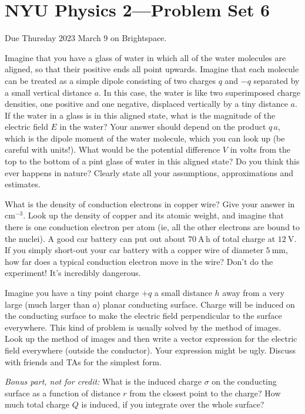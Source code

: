\documentclass[12pt]{article}
\begin{document}
\section*{NYU Physics 2---Problem Set 6}

Due Thursday 2023 March 9 on Brightspace.

\startproblem%
Imagine that you have a glass of water in which all of the water
molecules are aligned, so that their positive ends all point upwards.
Imagine that each molecule can be treated as a simple dipole
consisting of two charges $q$ and $-q$ separated by a small vertical
distance $a$.  In this case, the water is like two superimposed charge
densities, one positive and one negative, displaced vertically by a
tiny distance $a$.  If the water in a glass is in this aligned state,
what is the magnitude of the electric field $E$ in the water?  Your
answer should depend on the product $q\,a$, which is the dipole moment
of the water molecule, which you can look up (be careful with units!).  What would
be the potential difference $V$ in volts from the top to the bottom of
a pint glass of water in this aligned state? Do you think this ever
happens in nature? Clearly state all your assumptions, approximations
and estimates.

\startproblem%
What is the density of conduction electrons in copper wire?  Give your
answer in $\mathrm{cm^{-3}}$. Look up the density of copper and its
atomic weight, and imagine that there is one conduction electron per
atom (ie, all the other electrons are bound to the nuclei).  A good
car battery can put out about $70~\mathrm{A\,h}$ of total charge at
$12~\mathrm{V}$. If you simply short-out your car battery with a
copper wire of diameter $5~\mathrm{mm}$, how far does a typical
conduction electron move in the wire? Don't do the experiment! It's
incredibly dangerous.

\startproblem%
Imagine you have a tiny point charge $+q$ a small distance $h$ away
from a very large (much larger than $a$) planar conducting surface. Charge
will be induced on the conducting surface to make the electric field
perpendicular to the surface everywhere. This kind of problem is usually
solved by the method of images. Look up the method of images and
then write a vector expression for the electric field everywhere (outside
the conductor). Your expression might be ugly. Discuss with friends and
TAs for the simplest form.

\textsl{Bonus part, not for credit:} What is the induced charge
$\sigma$ on the conducting surface as a function of distance $r$ from
the closest point to the charge? How much total charge $Q$ is induced, if
you integrate over the whole surface?
\end{document}
